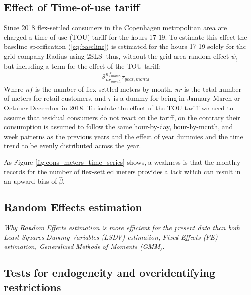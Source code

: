 \subsection{Effect of Time-of-use tariff}
\label{subsec:e_tout}
Since 2018 flex-settled consumers in the Copenhagen metropolitan area are charged a time-of-use (TOU) tariff for the hours 17-19. To estimate this effect the baseline specification (\ref{eq:baseline}) is estimated for the hours 17-19 solely for the grid company Radius using 2SLS, thus, without the grid-area random effect $\psi_i$ but including a term for the effect of the TOU tariff:
\begin{align}
  \beta\frac{nf_{month}}{nr_{month}}\tau_{year,month}
  \label{eq:tout}
\end{align}
Where $nf$ is the number of flex-settled meters by month, $nr$ is the total number of meters for retail customers, and $\tau$ is a dummy for being in January-March or October-December in 2018. To isolate the effect of the TOU tariff we need to assume that residual consumers do not react on the tariff, on the contrary their consumption is assumed to follow the same hour-by-day, hour-by-month, and week patterns as the previous years and the effect of year dummies and the time trend to be evenly distributed across the year.\par
As Figure \ref{fig:cons_meters_time_series} shows, a weakness is that the monthly records for the number of flex-settled meters provides a lack which can result in an upward bias of $\hat{\beta}$.


\subsection{Random Effects estimation}
\label{subsec:e_re}
\textit{Why Random Effects estimation is more efficient for the present data than both Least Squares Dummy Variables (LSDV) estimation, Fixed Effects (FE) estimation, Generalized Methods of Moments (GMM).}

\subsection{Tests for endogeneity and overidentifying restrictions}
\label{subsec:e_re}



